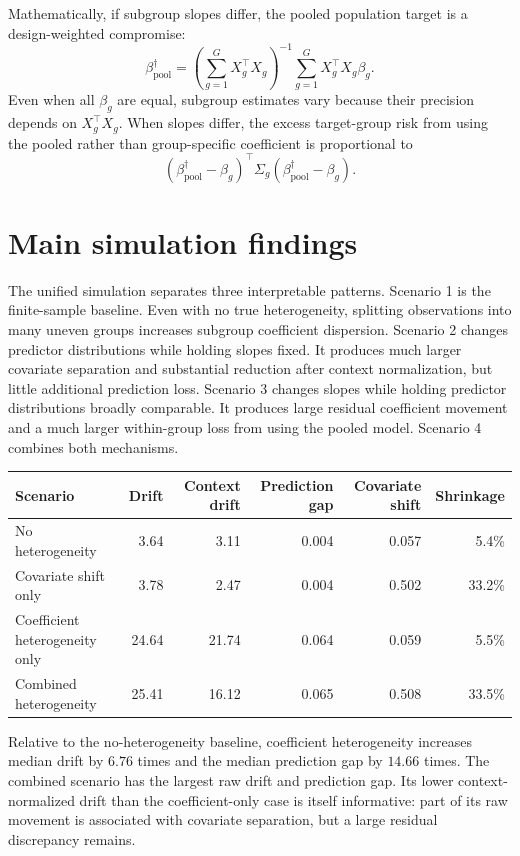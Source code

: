 \documentclass[10pt]{article}
\begin{document}
Mathematically, if subgroup slopes differ, the pooled population target is a design-weighted compromise:
\[
\beta_{\mathrm{pool}}^{\dagger}
= \left(\sum_{g=1}^{G}X_g^\top X_g\right)^{-1}
  \sum_{g=1}^{G}X_g^\top X_g\beta_g.
\]
Even when all $\beta_g$ are equal, subgroup estimates vary because their precision depends on $X_g^\top X_g$. When slopes differ, the excess target-group risk from using the pooled rather than group-specific coefficient is proportional to
\[
(\beta_{\mathrm{pool}}^{\dagger}-\beta_g)^\top\Sigma_g(\beta_{\mathrm{pool}}^{\dagger}-\beta_g).
\]

\section*{Main simulation findings}

The unified simulation separates three interpretable patterns. Scenario 1 is the finite-sample baseline. Even with no true heterogeneity, splitting observations into many uneven groups increases subgroup coefficient dispersion. Scenario 2 changes predictor distributions while holding slopes fixed. It produces much larger covariate separation and substantial reduction after context normalization, but little additional prediction loss. Scenario 3 changes slopes while holding predictor distributions broadly comparable. It produces large residual coefficient movement and a much larger within-group loss from using the pooled model. Scenario 4 combines both mechanisms.

\begin{center}
\small
\begin{tabular}{lrrrrr}
\toprule
Scenario & Drift & Context drift & Prediction gap & Covariate shift & Shrinkage \\
\midrule
No heterogeneity & 3.64 & 3.11 & 0.004 & 0.057 & 5.4\% \\
Covariate shift only & 3.78 & 2.47 & 0.004 & 0.502 & 33.2\% \\
Coefficient heterogeneity only & 24.64 & 21.74 & 0.064 & 0.059 & 5.5\% \\
Combined heterogeneity & 25.41 & 16.12 & 0.065 & 0.508 & 33.5\% \\
\bottomrule
\end{tabular}
\end{center}

Relative to the no-heterogeneity baseline, coefficient heterogeneity increases median drift by $6.76$ times and the median prediction gap by $14.66$ times. The combined scenario has the largest raw drift and prediction gap. Its lower context-normalized drift than the coefficient-only case is itself informative: part of its raw movement is associated with covariate separation, but a large residual discrepancy remains.
\end{document}
